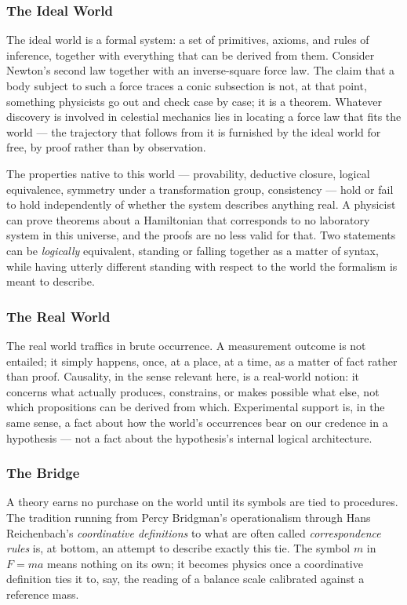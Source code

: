 \subsubsection{The Ideal World}

The ideal world is a formal system: a set of primitives, axioms, and rules of
inference, together with everything that can be derived from them. Consider
Newton's second law together with an inverse-square force law. The claim that a
body subject to such a force traces a conic subsection is not, at that point,
something physicists go out and check case by case; it is a theorem. Whatever
discovery is involved in celestial mechanics lies in locating a force law that
fits the world --- the trajectory that follows from it is furnished by the
ideal world for free, by proof rather than by observation.

The properties native to this world --- provability, deductive closure, logical
equivalence, symmetry under a transformation group, consistency --- hold or
fail to hold independently of whether the system describes anything real. A
physicist can prove theorems about a Hamiltonian that corresponds to no
laboratory system in this universe, and the proofs are no less valid for that.
Two statements can be \emph{logically} equivalent, standing or falling together
as a matter of syntax, while having utterly different standing with respect to
the world the formalism is meant to describe.

\subsubsection{The Real World}

The real world traffics in brute occurrence. A measurement outcome is not
entailed; it simply happens, once, at a place, at a time, as a matter of fact
rather than proof. Causality, in the sense relevant here, is a real-world
notion: it concerns what actually produces, constrains, or makes possible what
else, not which propositions can be derived from which. Experimental support
is, in the same sense, a fact about how the world's occurrences bear on our
credence in a hypothesis --- not a fact about the hypothesis's internal logical
architecture.

\subsubsection{The Bridge}

A theory earns no purchase on the world until its symbols are tied to
procedures. The tradition running from Percy Bridgman's operationalism through
Hans Reichenbach's \emph{coordinative definitions} to what are often called
\emph{correspondence rules} is, at bottom, an attempt to describe exactly this
tie. The symbol $m$ in $F = ma$ 
means nothing on its own; it becomes physics once a coordinative definition
ties it to, say, the reading of a balance scale calibrated against a reference
mass.

